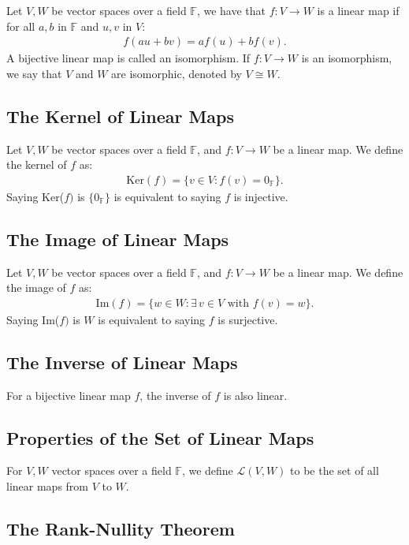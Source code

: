 \documentclass[a4paper, 12pt, twoside]{article}
\begin{document}
Let $V, W$ be vector spaces over a field $\mathbb{F}$, we have that
$f:V \to W$ is a linear map if for all $a, b$ in $\mathbb{F}$ and
$u, v$ in $V$: \begin{gather*}
  f(au+bv) = af(u) + bf(v).
\end{gather*} A bijective linear map is called an isomorphism.
If $f: V \to W$ is an isomorphism, we say that $V$ and $W$ are 
isomorphic, denoted by $V \cong W$. 

\subsection{The Kernel of Linear Maps}

Let $V, W$ be vector spaces over a field $\mathbb{F}$, and
$f : V \to W$ be a linear map. We define the kernel of $f$ as: \begin{gather*}
  \text{Ker}(f) = \{v \in V : f(v) = 0_{\mathbb{F}}\}.
\end{gather*} Saying Ker($f)$ is $\{0_\mathbb{F}\}$ is equivalent
to saying $f$ is injective.

\subsection{The Image of Linear Maps}

Let $V, W$ be vector spaces over a field $\mathbb{F}$, and
$f : V \to W$ be a linear map. We define the image of $f$ as: \begin{gather*}
  \text{Im}(f) = \{w \in W : \exists \, v \in V \text{ with } f(v) = w\}.
\end{gather*} Saying Im($f)$ is $W$ is equivalent
to saying $f$ is surjective.

\subsection{The Inverse of Linear Maps}

For a bijective linear map $f$, the inverse of $f$ is also linear.

\subsection{Properties of the Set of Linear Maps}

For $V, W$ vector spaces over a field $\mathbb{F}$, we define
$\mathcal{L}(V, W)$ to be the set of all linear maps from $V$
to $W$.

\subsection{The Rank-Nullity Theorem}
\end{document}
